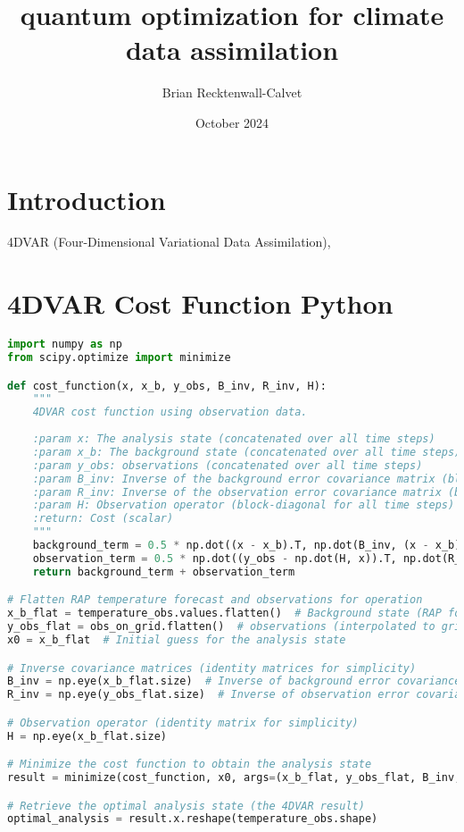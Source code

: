 \documentclass{article}
\title{quantum optimization for climate data assimilation}
\author{Brian Recktenwall-Calvet}
\date{October 2024}
\begin{document}
\maketitle

\section{Introduction}

4DVAR (Four-Dimensional Variational Data Assimilation), 


\section{4DVAR Cost Function Python}
\begin{lstlisting}[language=Python]
import numpy as np
from scipy.optimize import minimize

def cost_function(x, x_b, y_obs, B_inv, R_inv, H):
    """
    4DVAR cost function using observation data.
    
    :param x: The analysis state (concatenated over all time steps)
    :param x_b: The background state (concatenated over all time steps)
    :param y_obs: observations (concatenated over all time steps)
    :param B_inv: Inverse of the background error covariance matrix (block-diagonal for all time steps)
    :param R_inv: Inverse of the observation error covariance matrix (block-diagonal for all time steps)
    :param H: Observation operator (block-diagonal for all time steps)
    :return: Cost (scalar)
    """
    background_term = 0.5 * np.dot((x - x_b).T, np.dot(B_inv, (x - x_b)))
    observation_term = 0.5 * np.dot((y_obs - np.dot(H, x)).T, np.dot(R_inv, (y_obs - np.dot(H, x))))
    return background_term + observation_term

# Flatten RAP temperature forecast and observations for operation
x_b_flat = temperature_obs.values.flatten()  # Background state (RAP forecast)
y_obs_flat = obs_on_grid.flatten()  # observations (interpolated to grid)
x0 = x_b_flat  # Initial guess for the analysis state

# Inverse covariance matrices (identity matrices for simplicity)
B_inv = np.eye(x_b_flat.size)  # Inverse of background error covariance
R_inv = np.eye(y_obs_flat.size)  # Inverse of observation error covariance

# Observation operator (identity matrix for simplicity)
H = np.eye(x_b_flat.size)

# Minimize the cost function to obtain the analysis state
result = minimize(cost_function, x0, args=(x_b_flat, y_obs_flat, B_inv, R_inv, H), method='L-BFGS-B')

# Retrieve the optimal analysis state (the 4DVAR result)
optimal_analysis = result.x.reshape(temperature_obs.shape)

\end{lstlisting}
\end{document}
